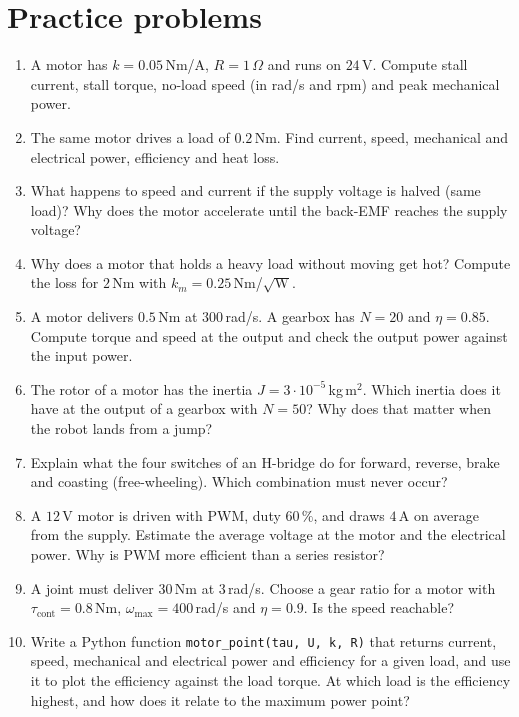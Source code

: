 \section*{Practice problems}
\begin{enumerate}[label=\textbf{\thechapter.\arabic*}]
  \item A motor has $k=0.05$\,Nm/A, $R=1\,\Omega$ and runs on $24$\,V. Compute stall current, stall torque, no-load speed (in rad/s and rpm) and peak mechanical power.
  \item The same motor drives a load of $0.2$\,Nm. Find current, speed, mechanical and electrical power, efficiency and heat loss.
  \item What happens to speed and current if the supply voltage is halved (same load)? Why does the motor accelerate until the back-EMF reaches the supply voltage?
  \item Why does a motor that holds a heavy load without moving get hot? Compute the loss for $2$\,Nm with $k_m=0.25$\,Nm/$\sqrt{\text{W}}$.
  \item A motor delivers $0.5$\,Nm at $300$\,rad/s. A gearbox has $N=20$ and $\eta=0.85$. Compute torque and speed at the output and check the output power against the input power.
  \item The rotor of a motor has the inertia $J=3\cdot10^{-5}$\,kg\,m$^2$. Which inertia does it have at the output of a gearbox with $N=50$? Why does that matter when the robot lands from a jump?
  \item Explain what the four switches of an H-bridge do for forward, reverse, brake and coasting (free-wheeling). Which combination must never occur?
  \item A $12$\,V motor is driven with PWM, duty $60\,\%$, and draws $4$\,A on average from the supply. Estimate the average voltage at the motor and the electrical power. Why is PWM more efficient than a series resistor?
  \item A joint must deliver $30$\,Nm at $3$\,rad/s. Choose a gear ratio for a motor with $\tau_\text{cont}=0.8$\,Nm, $\omega_\text{max}=400$\,rad/s and $\eta=0.9$. Is the speed reachable?
  \item[\textbf{\thechapter.10}$\star$] Write a Python function \texttt{motor\_point(tau, U, k, R)} that returns current, speed, mechanical and electrical power and efficiency for a given load, and use it to plot the efficiency against the load torque. At which load is the efficiency highest, and how does it relate to the maximum power point?
\end{enumerate}
